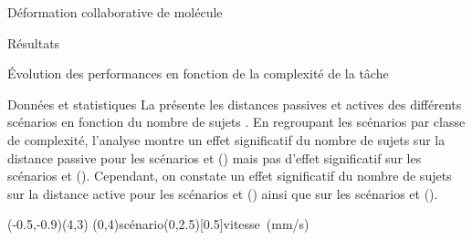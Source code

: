 \documentclass[myfrancais]{mythesis}
\begin{document}
\begin{mychapter}{Déformation collaborative de molécule}
\begin{mysection}{Résultats}
\begin{mysubsection}{Évolution des performances en fonction de la complexité de la tâche}
\begin{mysubsubsection}{Données et statistiques}
					La  présente les distances passives  et actives  des différents scénarios  en fonction du nombre de sujets .
					En regroupant les scénarios par classe de complexité, l'analyse montre un effet significatif du nombre de sujets  sur la distance passive  pour les scénarios  et  () mais pas d'effet significatif sur les scénarios  et  ().
					Cependant, on constate un effet significatif du nombre de sujets  sur la distance active  pour les scénarios  et  () ainsi que sur les scénarios  et  ().

					\begin{myfigure}
						\begin{myps}(-0.5,-0.9)(4,3)
							\myaxes(0,4){scénario}(0,2.5)[0.5]{vitesse~(mm/s)}
						\end{myps}
					\end{myfigure}


\end{mysubsubsection}
\end{mysubsection}
\end{mysection}
\end{mychapter}
\end{document}
